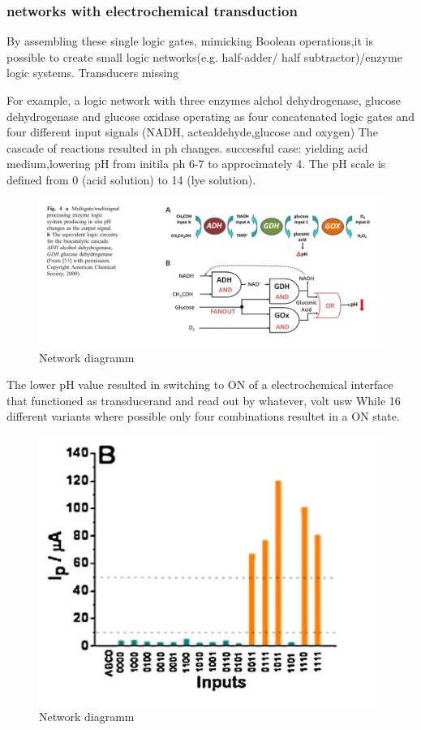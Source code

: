 \documentclass[runningheads]{llncs}
\begin{document}
	\subsubsection{networks with electrochemical transduction}
	By assembling these single logic gates, mimicking Boolean operations,it is possible to create small logic networks(e.g. half-adder/ half subtractor)/enzyme logic systems. Transducers missing 
	
	For example, a logic network with three enzymes alchol dehydrogenase, glucose dehydrogenase and glucose oxidase operating as four concatenated logic gates and four different input signals (NADH,  actealdehyde,glucose and oxygen) The cascade of reactions resulted in ph changes. 
	successful case: yielding acid medium,lowering pH from initila ph 6-7 to approcimately 4. The pH scale is defined from 0 (acid solution) to 14 (lye solution).
	
	\begin{figure} \centering \includegraphics[scale= 0.3]{pics/biocomputing_sensor.png} \caption{Network diagramm} \label{img:grafik-test} \end{figure}
	
	
	The lower pH value resulted in switching to ON of a electrochemical interface that functioned as transducerand and  read out by whatever, volt usw
	While 16 different variants where possible only four combinations resultet in a ON state.

	\begin{figure} \centering \includegraphics[scale= 0.2]{pics/ph.png} \caption{Network diagramm} \label{img:ph} \end{figure}
	
\end{document}
